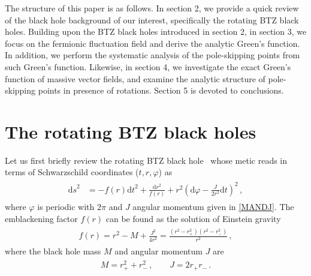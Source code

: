 \documentclass[11pt,a4paper]{article}
\newcommand{\td}{\text{d}}
\begin{document}
The structure of this paper is as follows.
In section {2}, we provide a quick review of the black hole background of our interest, specifically the rotating BTZ black holes. Building upon the BTZ black holes introduced in section {2}, in section {3}, we focus on the fermionic fluctuation field and derive the analytic Green's function. In addition, we perform the systematic analysis of the pole-skipping points from such Green's function. Likewise, in section {4}, we investigate the exact Green's function of massive vector fields, and examine the analytic structure of pole-skipping points in presence of rotations. 
Section {5} is devoted to conclusions.








%    
\section{The rotating BTZ black holes}\label{sec:The rotating BTZ black holes}

Let us first briefly review the rotating BTZ black hole~\cite{Banados:1992wn,Banados:1992gq} whose metic reads in terms of Schwarzschild coordinates ($t,r,\varphi$) as
\begin{align}\label{eq:metric}
\begin{split}
    {\td s}^2 & =-f(r) {\td t}^2+\frac{{\td r}^2}{f(r)}+r^2 \left(\td\varphi-\frac{J}{2r^2}\td t \right)^2\,,
\end{split}
\end{align}
where $\varphi$ is periodic with $2\pi$ and $J$ angular momentum given in \eqref{MANDJ}. 
The emblackening factor $f(r)$ can be found as the solution of Einstein gravity 
\begin{align}\label{EMF}
\begin{split}
    f(r) = r^2 - M + \frac{J^2}{4 r^2} = \frac{(r^2-r_+^2)(r^2-r_-^2)}{r^2}\,,
\end{split}
\end{align}
where the black hole mass $M$ and angular momentum $J$ are 
\begin{align}\label{MANDJ}
\begin{split}
    M=r_+^2+r_-^2 \,, \qquad J =2 r_+ r_- \,.
\end{split}
\end{align}
\end{document}
